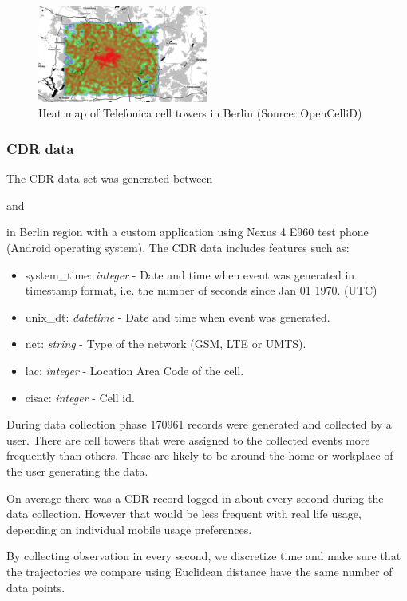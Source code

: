 \begin{figure}[h]
    \includegraphics[width=0.5\textwidth]{images/opencellid.png}
    \caption{Heat map of Telefonica cell towers in Berlin (Source: OpenCelliD) }
    \label{fig:opencellid}
\end{figure}

\subsubsection{CDR data}
The CDR data set was generated between \date{2018/02/26} and \date{2018/03/16} in Berlin region with a custom application using Nexus 4 E960 test phone (Android operating system). The CDR data includes features such as:
\begin{itemize}
\item system\_time: \textit{integer} - Date and time when event was generated in timestamp format, i.e. the number of seconds since Jan 01 1970. (UTC)
\item unix\_dt: \textit{datetime} - Date and time when event was generated.
\item net: \textit{string} - Type of the network (GSM, LTE or UMTS).
\item lac: \textit{integer} - Location Area Code of the cell.
\item cisac: \textit{integer} - Cell id.
\end{itemize}

During data collection phase 170961 records were generated and collected by a user. There are cell towers that were assigned to the collected events more frequently than others. These are likely to be around the home or workplace of the user generating the data.

On average there was a CDR record logged in about every second during the data collection. However that would be less frequent with real life usage, depending on individual mobile usage preferences. 

By collecting observation in every second, we discretize time and make sure that the trajectories we compare using Euclidean distance have the same number of data points.


